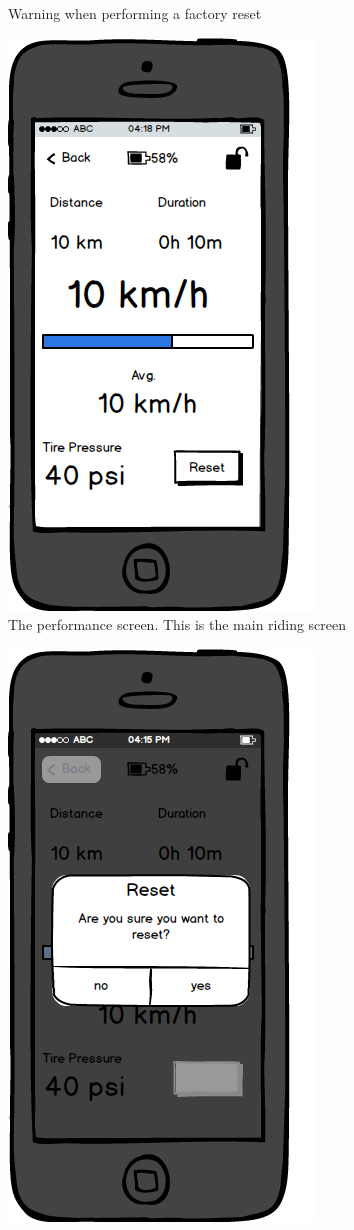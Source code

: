 \documentclass[a4paper]{report}
\begin{document}
{\begin{figure}
\caption{Warning when performing a factory reset}
\end{figure}
\clearpage
\begin{figure}
\centering
\includegraphics[scale=0.9]{figures/prototype_1/perf}
\caption{The performance screen. This is the main riding screen}
\end{figure}
\clearpage
\begin{figure}
\centering
\includegraphics[scale=0.9]{figures/prototype_1/reset_perf}

\end{figure}}
\end{document}

